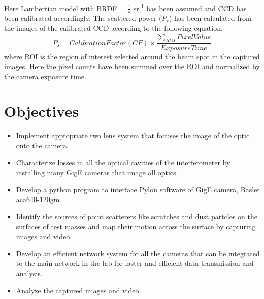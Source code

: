 \documentclass[colorlinks=true,pdfstartview=FitV,linkcolor=blue,
            citecolor=red,urlcolor=magenta]{ligodoc}
\begin{document}
Here Lambertian model with BRDF = $\frac{1}{\pi}$  sr\textsuperscript{-1} has been assumed and CCD has been calibrated accordingly. The scattered power ($P_{s}$) has been calculated from the images of the calibrated CCD according to the following equation,
\begin{equation}
    P_{s} = Calibration Factor (CF) \times  \frac{\sum\limits_{ROI} Pixel Value}{Exposure Time} 
\end{equation}
where ROI is the region of interest selected around the beam spot in the captured images. Here the pixel counts have been summed over the ROI and normalized by the camera exposure time. \cite{6}

\section{Objectives}
\begin{itemize}
    \item Implement appropriate two lens system that focuses the image of the optic onto the camera.
    \item Characterize losses in all the optical cavities of the interferometer by installing many GigE cameras that image all optics.
    \item Develop a python program to interface Pylon software of GigE camera, Basler aca640-120gm.
    \item Identify the sources of point scatterers like scratches and dust partcles on the surfaces of test masses and map their motion across the surface by capturing images and video.
    \item Develop an efficient network system for all the cameras that can be integrated to the main network in the lab for faster and efficient data transmission and analysis.
    \item Analyze the captured images and video.
    
    
\end{itemize}
\end{document}
